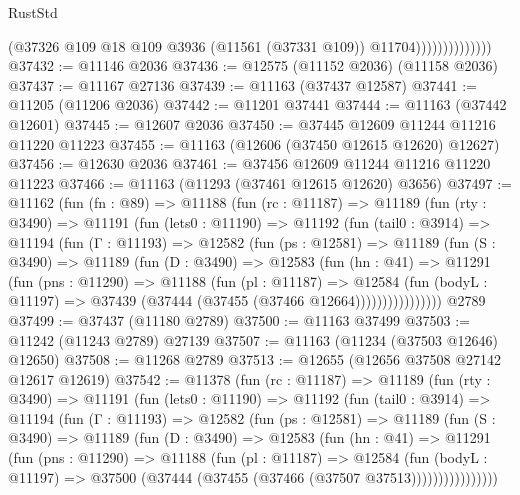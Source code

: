 \begin{lexlean}{RustStd}
\begin{coremodule}
                              (@37326
                                @109
                                @18
                                @109
                                @3936
                                (@11561 (@37331 @109))
                                @11704))))))))))))))
@37432 := @11146 @2036
@37436 := @12575 (@11152 @2036) (@11158 @2036)
@37437 := @11167 @27136
@37439 := @11163 (@37437 @12587)
@37441 := @11205 (@11206 @2036)
@37442 := @11201 @37441
@37444 := @11163 (@37442 @12601)
@37445 := @12607 @2036
@37450 := @37445 @12609 @11244 @11216 @11220 @11223
@37455 := @11163 (@12606 (@37450 @12615 @12620) @12627)
@37456 := @12630 @2036
@37461 := @37456 @12609 @11244 @11216 @11220 @11223
@37466 := @11163 (@11293 (@37461 @12615 @12620) @3656)
@37497 := @11162
    (fun (fn : @89) =>
    @11188
      (fun (rc : @11187) =>
      @11189
        (fun (rty : @3490) =>
        @11191
          (fun (lets0 : @11190) =>
          @11192
            (fun (tail0 : @3914) =>
            @11194
              (fun (Γ : @11193) =>
              @12582
                (fun (ps : @12581) =>
                @11189
                  (fun (S : @3490) =>
                  @11189
                    (fun (D : @3490) =>
                    @12583
                      (fun (hn : @41) =>
                      @11291
                        (fun (pns : @11290) =>
                        @11188
                          (fun (pl : @11187) =>
                          @12584
                            (fun (bodyL : @11197) =>
                            @37439 (@37444 (@37455 (@37466 @12664))))))))))))))))
    @2789
@37499 := @37437 (@11180 @2789)
@37500 := @11163 @37499
@37503 := @11242 (@11243 @2789) @27139
@37507 := @11163 (@11234 (@37503 @12646) @12650)
@37508 := @11268 @2789
@37513 := @12655 (@12656 @37508 @27142 @12617 @12619)
@37542 := @11378
    (fun (rc : @11187) =>
    @11189
      (fun (rty : @3490) =>
      @11191
        (fun (lets0 : @11190) =>
        @11192
          (fun (tail0 : @3914) =>
          @11194
            (fun (Γ : @11193) =>
            @12582
              (fun (ps : @12581) =>
              @11189
                (fun (S : @3490) =>
                @11189
                  (fun (D : @3490) =>
                  @12583
                    (fun (hn : @41) =>
                    @11291
                      (fun (pns : @11290) =>
                      @11188
                        (fun (pl : @11187) =>
                        @12584
                          (fun (bodyL : @11197) =>
                          @37500 (@37444 (@37455 (@37466 (@37507 @37513))))))))))))))))

\end{coremodule}
\end{lexlean}
